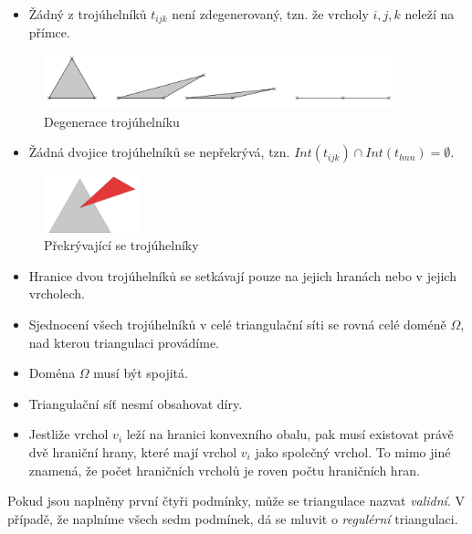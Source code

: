 \documentclass[12pt,a4paper]{article}
\begin{document}
\begin{itemize}
\item Žádný z trojúhelníků $t_{ijk}$ není zdegenerovaný, tzn. že vrcholy $i, j, k$ neleží na přímce.
\end{itemize}
\begin{figure}[h!]
\centering
\includegraphics[width=0.9\textwidth]{img/podm_1.png}
\caption{Degenerace trojúhelníku}
\label{fig:podm_1}
\end{figure}
\begin{itemize}
\item Žádná dvojice trojúhelníků se nepřekrývá, tzn. $Int(t_{ijk}) \cap Int(t_{lmn}) = \emptyset$.
\end{itemize}
\begin{figure}[h!]
\centering
\includegraphics[width=0.25\textwidth]{img/podm_2.png}
\caption{Překrývající se trojúhelníky}
\label{fig:podm_2}
\end{figure}
\begin{itemize}
\item Hranice dvou trojúhelníků se setkávají pouze na jejich hranách
  nebo v jejich vrcholech.

\item Sjednocení všech trojúhelníků v celé triangulační síti se rovná
  celé doméně $\Omega$, nad kterou triangulaci provádíme.

\item Doména $\Omega$ musí být spojitá.

\item Triangulační síť nesmí obsahovat díry.

\item Jestliže vrchol $v_i$ leží na hranici konvexního obalu, pak musí
  existovat právě dvě hraniční hrany, které mají vrchol $v_i$ jako
  společný vrchol. To mimo jiné znamená, že počet hraničních vrcholů
  je roven počtu hraničních hran.
\end{itemize}
\bigskip

Pokud jsou naplněny první čtyři podmínky, může se triangulace nazvat
\emph{validní}. V případě, že naplníme všech sedm podmínek, dá se
mluvit o \emph{regulérní} triangulaci.
\end{document}
